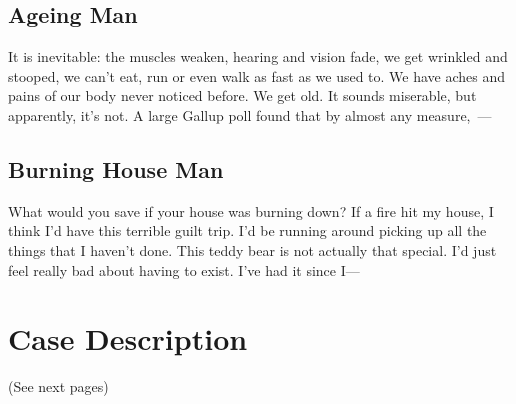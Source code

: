 \documentclass[11pt]{article}
\begin{document}
\subsection*{Ageing Man}
It is inevitable: the muscles weaken, hearing and vision fade, we get wrinkled and stooped, we can't eat, run or even walk as fast as we used to. We have aches and pains of our body never noticed before. We get old. It sounds miserable, but apparently, it's not. A large Gallup poll found that by almost any measure,~---

\subsection*{Burning House Man}
What would you save if your house was burning down? If a fire hit my house, I think I'd have this terrible guilt trip. I'd be running around picking up all the things that I haven't done. This teddy bear is not actually that special. I'd just feel really bad about having to exist. I've had it since I---

\section{Case Description}
(See next pages)
\label{app:case}

\end{document}
